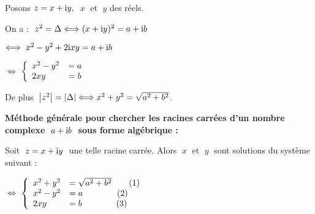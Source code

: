    \medskip
   
   Posons $ z=x+\text{i} y ,\;$   $ x\;$ et $\; y$ des réels.
   
   \medskip
   On a : $ \; z^2= \Delta \Longleftrightarrow (x+\text{i} y)^2=a+\text{i} b $
   
   \medskip
   \hspace*{2cm} $ \Longleftrightarrow \; x^2 -y^2 +2\text{i} x y =a+\text{i} b$
   
   \medskip
   
  \hspace*{2cm}  $ \Longleftrightarrow  $ 
 $\left\{\begin{array}{l c}
 x^2 -y^2 & =a\\ 	 
 2xy& = b
\end{array}\right.$ 

\medskip

De plus $\; \left\lvert z^2 \right\rvert =\left\lvert \Delta \right\rvert\Longleftrightarrow   x^2 +y^2=\sqrt{a^2+b^2}$.

\medskip

\textbf{Méthode générale  pour chercher les racines carrées d'un nombre 
complexe  $\; a+\text{i} b \;$ sous forme algébrique :} 


\medskip
Soit $ \;z = x +\text{i} y\; $ une telle racine carrée. Alors $\; x \;$ et $\; y\; $ sont solutions du système suivant :

   \medskip
   
  \hspace*{2cm}  $ \Longleftrightarrow  $ 
 $\left\{\begin{array}{l l}
 x^2 +y^2&=\sqrt{a^2+b^2}\qquad (1)\\
 x^2 -y^2 & =a\qquad \qquad (2)\\ 	 
 2xy& = b  \qquad \qquad (3)
\end{array}\right.$ 

\medskip

